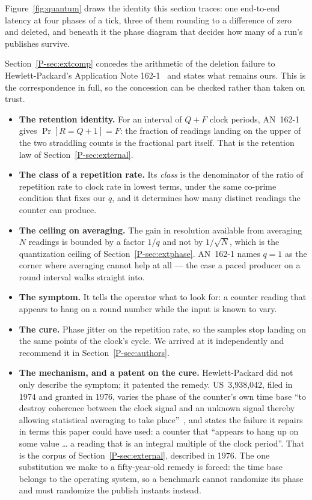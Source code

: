 \documentclass[10pt,journal,onecolumn]{IEEEtran}
\newcommand{\mainModeB}{\ref{P-sec:external}}              %
\newcommand{\mainPhase}{\ref{P-sec:extphase}}            %
\newcommand{\mainAuthors}{\ref{P-sec:authors}}        %
\newcommand{\mainLaw}{\ref{P-sec:extcomp}}                %
\begin{document}
Figure~\ref{fig:quantum} draws the identity this section traces: one end-to-end latency at
four phases of a tick, three of them rounding to a difference of zero and deleted, and beneath
it the phase diagram that decides how many of a run's publishes survive.


Section~\mainLaw{} concedes the arithmetic of the deletion failure to Hewlett-Packard's Application
Note 162-1~\cite{hp1970tia} and states what remains ours. This is the correspondence in full,
so the concession can be checked rather than taken on trust.

\begin{itemize}
\item \textbf{The retention identity.} For an interval of $Q + F$ clock periods, AN~162-1
gives $\Pr[R = Q{+}1] = F$: the fraction of readings landing on the upper of the two
straddling counts is the fractional part itself. That is the retention law of
Section~\mainModeB{}.
\item \textbf{The class of a repetition rate.} Its \emph{class} is the denominator of the
ratio of repetition rate to clock rate in lowest terms, under the same co-prime condition
that fixes our $q$, and it determines how many distinct readings the counter can produce.
\item \textbf{The ceiling on averaging.} The gain in resolution available from averaging $N$
readings is bounded by a factor $1/q$ and not by $1/\sqrt{N}$, which is the quantization
ceiling of Section~\mainPhase{}. AN~162-1 names $q = 1$ as the corner where averaging cannot help at
all --- the case a paced producer on a round interval walks straight into.
\item \textbf{The symptom.} It tells the operator what to look for: a counter reading that
appears to hang on a round number while the input is known to vary.
\item \textbf{The cure.} Phase jitter on the repetition rate, so the samples stop landing on
the same points of the clock's cycle. We arrived at it independently and recommend it in
Section~\mainAuthors{}.
\item \textbf{The mechanism, and a patent on the cure.} Hewlett-Packard did not only describe
the symptom; it patented the remedy. US~3,938,042, filed in 1974 and granted in 1976,
varies the phase of the counter's own time base ``to destroy coherence between the clock
signal and an unknown signal thereby allowing statistical averaging to take
place''~\cite{hp1976dither}, and states the failure it repairs in terms this paper could have
used: a counter that ``appears to hang up on some value \ldots{} a reading that is an integral
multiple of the clock period''. That is the corpus of Section~\mainModeB{}, described in 1976.
The one substitution we make to a fifty-year-old remedy is forced: the time base belongs to
the operating system, so a benchmark cannot randomize its phase and must randomize the publish
instants instead.
\end{itemize}
\end{document}
